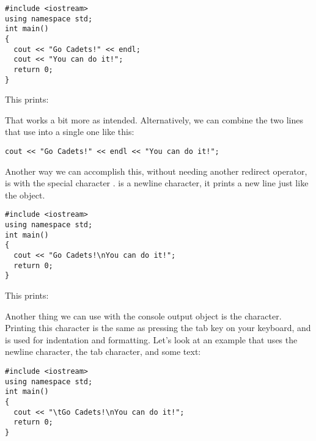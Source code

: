 \noindent\begin{minipage}{\linewidth}\begin{lstlisting}
#include <iostream>
using namespace std;
int main()
{
  cout << "Go Cadets!" << endl;
  cout << "You can do it!";
  return 0;
}
\end{lstlisting}\end{minipage}

\noindent This prints:

\noindent {}

\noindent {}

That works a bit more as intended. 
Alternatively, we can combine the two lines that use  into a single one like this:

\noindent\begin{minipage}{\linewidth}\begin{lstlisting}
cout << "Go Cadets!" << endl << "You can do it!";
\end{lstlisting}\end{minipage}

Another way we can accomplish this, without needing another redirect operator, is with the special character .
 is a newline character, it prints a new line just like the  object. 

\noindent\begin{minipage}{\linewidth}\begin{lstlisting}
#include <iostream>
using namespace std;
int main()
{
  cout << "Go Cadets!\nYou can do it!";
  return 0;
}
\end{lstlisting}\end{minipage}

\noindent This prints:

\noindent {}

\noindent {}

Another thing we can use with the console output object is the  character. 
Printing this character is the same as pressing the tab key on your keyboard, and is used for indentation and formatting. 
Let's look at an example that uses the newline character, the tab character, and some text:

\noindent\begin{minipage}{\linewidth}\begin{lstlisting}
#include <iostream>
using namespace std;
int main()
{
  cout << "\tGo Cadets!\nYou can do it!";
  return 0;
}
\end{lstlisting}\end{minipage}

